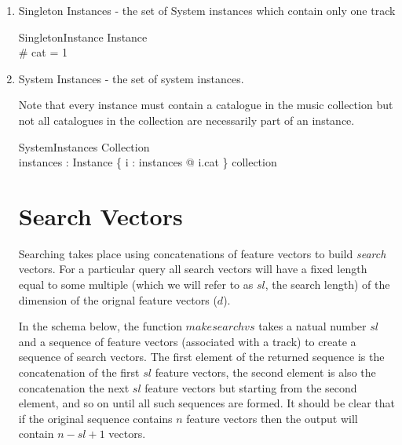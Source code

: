 \documentclass[11pt]{article}
\begin{document}
\begin{enumerate}
\item  \textsf{Singleton Instances}  - the set of System instances which contain only one track

\begin{schema}{SingletonInstance} 
	Instance \\
\where
	\# cat = 1 
\end{schema}

\item  \textsf{System Instances}  - the set of system instances.

Note that every instance must contain a catalogue in the music collection but not all catalogues in the collection are necessarily part of an instance. 

\begin{schema}{SystemInstances}
		Collection \\
		instances : \power Instance
\where
		\{ i : instances @ i.cat \} \subseteq collection
\end{schema}
		
\section{Search Vectors}
Searching takes place using concatenations of feature vectors to build \emph{search} vectors. For a particular query all search vectors will have a fixed length equal to some multiple (which we will refer to as $sl$, the search length) of the dimension of the orignal feature vectors ($d$). 

In the schema below, the function $makesearchvs$ takes a natual number $sl$ and a sequence of feature vectors (associated with a track) to create a sequence of search vectors. The first element of the returned sequence is the concatenation of the first $sl$ feature vectors, the second element is also the concatenation the next $sl$ feature vectors but starting from the second element, and so on until all such sequences are formed.  It should be clear that if the original sequence contains $n$ feature vectors then the output will contain $n-sl+1$ vectors. 


\end{enumerate}
\end{document}
